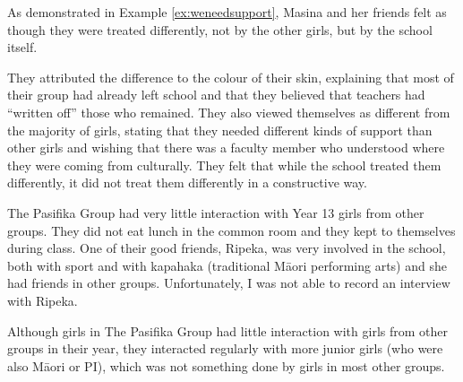 \vspace{5 mm}



\noindent As demonstrated in Example \ref{ex:weneedsupport}, Masina and her friends felt as though they were treated differently, not by the other girls, but by the school itself. 

\label{ex:weneedsupport}				
					
\vspace{5 mm}

\noindent They attributed the difference to the colour of their skin, explaining that most of their group had already left school and that they believed that teachers had ``written off'' those who remained. They also viewed themselves as different from the majority of girls, stating that they needed different kinds of support than other girls and wishing that there was a faculty member who understood where they were coming from culturally. They felt that while the school treated them differently, it did not treat them differently in a constructive way.


The Pasifika Group had very little interaction with Year 13 girls from other groups. They did not eat lunch in the common room and they kept to themselves during class. One of their good friends, Ripeka, was very involved in the school, both with sport and with kapahaka (traditional M\=aori performing arts) and she had friends in other groups. Unfortunately, I was not able to record an interview with Ripeka.

Although girls in The Pasifika Group had little interaction with girls from other groups in their year, they interacted regularly with more junior girls (who were also M\=aori or PI), which was not something done by girls in most other groups. 

